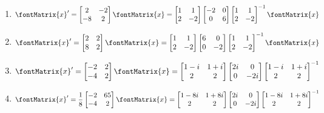 \begin{enumerate}[label=(\alph*)]
\item\label{itm : Exam4Q2e} $\displaystyle \fontMatrix{x}' = \begin{bmatrix}2&-2\\-8&2\end{bmatrix} \fontMatrix{x} = \begin{bmatrix}1&1\\2&-2\end{bmatrix} \begin{bmatrix}-2&0\\0&6\end{bmatrix} \begin{bmatrix}1&1\\2&-2\end{bmatrix}^{-1} \fontMatrix{x}$
\item\label{itm : Exam4Q2f} $\displaystyle \fontMatrix{x}' = \begin{bmatrix}2&2\\8&2\end{bmatrix} \fontMatrix{x} = \begin{bmatrix}1&1\\2&-2\end{bmatrix} \begin{bmatrix}6&0\\0&-2\end{bmatrix} \begin{bmatrix}1&1\\2&-2\end{bmatrix}^{-1} \fontMatrix{x}$
\item\label{itm : Exam4Q2g} $\displaystyle \fontMatrix{x}' = \begin{bmatrix}-2&2\\-4&2\end{bmatrix} \fontMatrix{x} = \begin{bmatrix}1 - i&1 + i\\2&2\end{bmatrix} \begin{bmatrix}2 i&0\\0&-2 i\end{bmatrix} \begin{bmatrix}1 - i&1 + i\\2&2\end{bmatrix}^{-1}$
\item\label{itm : Exam4Q2h} $\displaystyle \fontMatrix{x}' = \frac{1}{8} \begin{bmatrix}-2&65\\-4&2\end{bmatrix} \fontMatrix{x} = \begin{bmatrix}1 - 8 i&1 + 8 i\\2&2\end{bmatrix} \begin{bmatrix}2 i&0\\0&-2 i\end{bmatrix} \begin{bmatrix}1 - 8 i&1 + 8 i\\2&2\end{bmatrix}^{-1}$

\end{enumerate}
